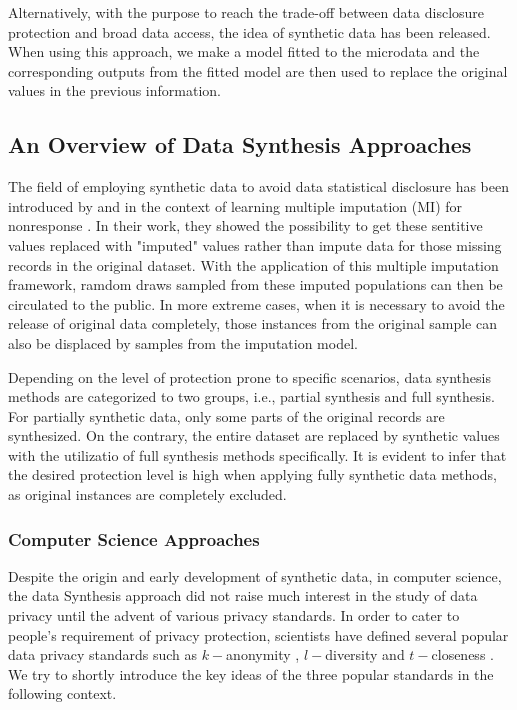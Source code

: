 Alternatively, with the purpose to reach the trade-off between data disclosure protection and broad
data access, the idea of synthetic data has been released. When using this approach, we make a model
fitted to the microdata and the corresponding outputs from the fitted model are then used to replace
the original values in the previous information.


\subsection{An Overview of Data Synthesis Approaches}
\label{subsec:datasynthesis}
The field of employing synthetic data to avoid data statistical disclosure has been introduced by \citet{rubin1993statistical}
and \citet{little1993statistical} in the context of learning multiple imputation (MI) for nonresponse \citep{little2019statistical}.
In their work, they showed the possibility to get these sentitive values replaced with "imputed" values
rather than impute data for those missing records in the original dataset. With the application of this multiple
imputation framework, ramdom draws sampled from these imputed populations can then be circulated to the public. In more
extreme cases, when it is necessary to avoid the release of original data completely, those instances from
the original sample can also be displaced by samples from the imputation model.

Depending on the level of protection prone to specific scenarios, data synthesis methods are categorized to two groups, i.e.,
partial synthesis and full synthesis. For partially synthetic data, only some parts of the original records are synthesized. 
On the contrary, the entire dataset are replaced by synthetic values with the utilizatio of full synthesis methods specifically.
It is evident to infer that the desired protection level is high when applying fully synthetic data methods, as original instances
are completely excluded. 



\subsubsection{Computer Science Approaches}
\label{subsubsec:csapproach}
Despite the origin and early development of synthetic data, in computer science, the data Synthesis
approach did not raise much interest in the study of data privacy until the advent of various privacy
standards. In order to cater to people's requirement of privacy protection, scientists have defined
several popular data privacy standards such as $k-$anonymity \citep{sweeney2002k}, $l-$diversity \citep{machanavajjhala2007diversity}
and $t-$closeness \citep{li2006t}. We try to shortly introduce the key ideas of the three popular
standards in the following context. 

